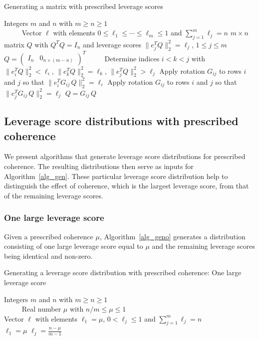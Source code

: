 \documentclass{siamltex}
\begin{document}
\begin{algorithm}
\caption{Generating a matrix with prescribed leverage scores
\cite{DHST05}}\label{alg_gen}
\begin{algorithmic}
\REQUIRE Integers $m$ and $n$ with $m\geq n\geq 1$\\
$\qquad\ $ Vector $\ell$ with elements $0\leq \ell_1\leq\cdots
\leq \ell_m\leq 1$ 
and $\sum_{j=1}^m{\ell_j}=n$ 
\ENSURE $m\times n$ matrix $Q$ with $Q^TQ=I_n$ and 
leverage scores $\|e_j^TQ\|_2^2 =\ell_j$, $1\leq j\leq m$\\
$\qquad$\\
\STATE $Q=\begin{pmatrix}I_n & 0_{n\times (m-n)}\end{pmatrix}^T$
$\qquad$ 
\REPEAT
\STATE Determine indices $i<k<j$ with\\
$\|e_i^TQ\|_2^2<\ell_i$, $\|e_k^TQ\|_2^2=\ell_k$, $\|e_j^TQ\|_2^2>\ell_j$
\STATE Apply rotation $G_{ij}$ to rows $i$ and $j$ so that 
$\|e_i^TG_{ij}\,Q\|_2^2=\ell_i$
\ELSE 
\STATE Apply rotation $G_{ij}$ to rows $i$ and $j$ so that 
$\|e_j^TG_{ij}\,Q\|_2^2=\ell_j$
\ENDIF
\STATE $Q=G_{ij}\,Q$ $\qquad$ 
\end{algorithmic}
\end{algorithm}

\subsection{Leverage score distributions with prescribed 
coherence}\label{s_precoh}
We present algorithms that generate leverage score distributions for 
prescribed coherence. The resulting distributions then serve 
as inputs for Algorithm~\ref{alg_gen}.
These particular leverage score distribution help to distinguish the effect 
of coherence, which is the largest leverage score, from that of the
remaining leverage scores.

\subsubsection*{One large leverage score}
Given a prescribed coherence $\mu$,
Algorithm~\ref{alg_geno} generates a distribution consisting of 
one large leverage score equal to $\mu$ and the remaining leverage scores
being identical and non-zero. 

\begin{algorithm}
\caption{Generating a leverage score distribution with prescribed coherence:
One large leverage score}\label{alg_geno}
\begin{algorithmic}
\REQUIRE Integers $m$ and $n$ with $m\geq n\geq 1$\\
\STATE $\qquad\ $ Real number $\mu$ with $n/m\leq \mu\leq 1$\\
\ENSURE Vector $\ell$ with elements $\ell_1=\mu$, $0< \ell_j \leq 1$ 
and $\sum_{j=1}^m{\ell_j}=n$\\
$\qquad$\\
\STATE $\ell_1=\mu$ 
\STATE $\ell_j=\tfrac{n-\mu}{m-1}$ 
\ENDFOR
\end{algorithmic}
\end{algorithm}
\end{document}
